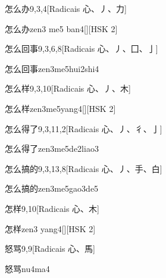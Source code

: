 \begin{entry}{怎么办}{9,3,4}[Radicais ⼼、⼃、⼒]
  \begin{phonetics}{怎么办}{zen3 me5 ban4}[][HSK 2]
  \end{phonetics}
\end{entry}

\begin{entry}{怎么回事}{9,3,6,8}[Radicais ⼼、⼃、⼞、⼅]
  \begin{phonetics}{怎么回事}{zen3me5hui2shi4}
  \end{phonetics}
\end{entry}

\begin{entry}{怎么样}{9,3,10}[Radicais ⼼、⼃、⽊]
  \begin{phonetics}{怎么样}{zen3me5yang4}[][HSK 2]
  \end{phonetics}
\end{entry}

\begin{entry}{怎么得了}{9,3,11,2}[Radicais ⼼、⼃、⼻、⼅]
  \begin{phonetics}{怎么得了}{zen3me5de2liao3}
  \end{phonetics}
\end{entry}

\begin{entry}{怎么搞的}{9,3,13,8}[Radicais ⼼、⼃、⼿、⽩]
  \begin{phonetics}{怎么搞的}{zen3me5gao3de5}
  \end{phonetics}
\end{entry}

\begin{entry}{怎样}{9,10}[Radicais ⼼、⽊]
  \begin{phonetics}{怎样}{zen3 yang4}[][HSK 2]
  \end{phonetics}
\end{entry}

\begin{entry}{怒骂}{9,9}[Radicais ⼼、⾺]
  \begin{phonetics}{怒骂}{nu4ma4}
  \end{phonetics}
\end{entry}

